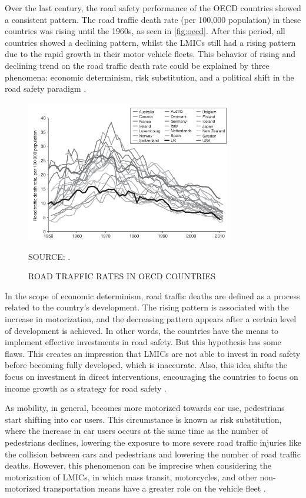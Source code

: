 Over the last century, the road safety performance of the OECD countries showed a consistent pattern. The road traffic death rate (per 100,000 population) in these countries was rising until the 1960s, as seen in \autoref{fig:oecd}. After this period, all countries showed a declining pattern, whilst the LMICs still had a rising pattern due to the rapid growth in their motor vehicle fleets. This behavior of rising and declining trend on the road traffic death rate could be explained by three phenomena: economic determinism, risk substitution, and a political shift in the road safety paradigm \cite{Bhalla2016}.

\begin{figure}[!htbp]
    \centering\footnotesize
    \captionsetup{font=footnotesize}
    \caption{ROAD TRAFFIC RATES IN OECD COUNTRIES}
    \includegraphics[width=0.8\textwidth]{fig/oecd.png}
    \label{fig:oecd}
    \par SOURCE: \textcite{Bhalla2016}.
\end{figure}

In the scope of economic determinism, road traffic deaths are defined as a process related to the country's development. The rising pattern is associated with the increase in motorization, and the decreasing pattern appears after a certain level of development is achieved. In other words, the countries have the means to implement effective investments in road safety. But this hypothesis has some flaws. This creates an impression that LMICs are not able to invest in road safety before becoming fully developed, which is inaccurate. Also, this idea shifts the focus on investment in direct interventions, encouraging the countries to focus on income growth as a strategy for road safety \cite{Bhalla2016}.

As mobility, in general, becomes more motorized towards car use, pedestrians start shifting into car users. This circumstance is known as risk substitution, where the increase in car users occurs at the same time as the number of pedestrians declines, lowering the exposure to more severe road traffic injuries like the collision between cars and pedestrians and lowering the number of road traffic deaths. However, this phenomenon can be imprecise when considering the motorization of LMICs, in which mass transit, motorcycles, and other non-motorized transportation means have a greater role on the vehicle fleet \cite{Bhalla2016}.   

